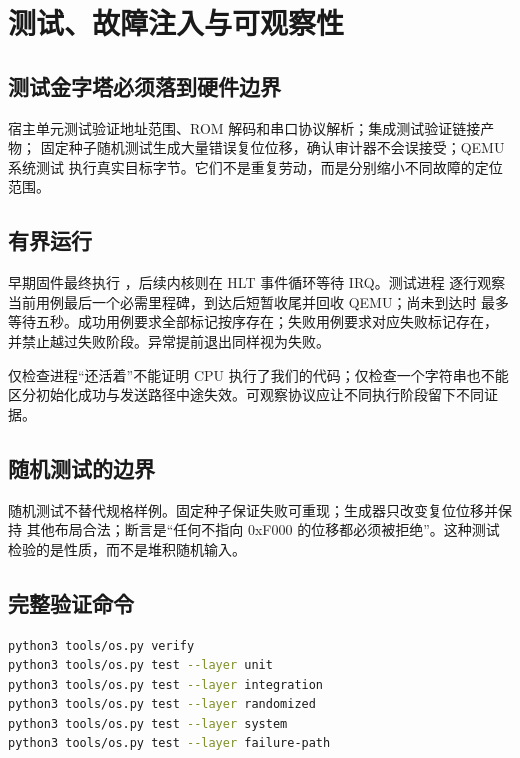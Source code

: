 \section{测试、故障注入与可观察性}

\subsection{测试金字塔必须落到硬件边界}

宿主单元测试验证地址范围、ROM 解码和串口协议解析；集成测试验证链接产物；
固定种子随机测试生成大量错误复位位移，确认审计器不会误接受；QEMU 系统测试
执行真实目标字节。它们不是重复劳动，而是分别缩小不同故障的定位范围。

\subsection{有界运行}

早期固件最终执行 ，后续内核则在 HLT 事件循环等待 IRQ。测试进程
逐行观察当前用例最后一个必需里程碑，到达后短暂收尾并回收 QEMU；尚未到达时
最多等待五秒。成功用例要求全部标记按序存在；失败用例要求对应失败标记存在，
并禁止越过失败阶段。异常提前退出同样视为失败。

\begin{failurebox}
仅检查进程“还活着”不能证明 CPU 执行了我们的代码；仅检查一个字符串也不能
区分初始化成功与发送路径中途失效。可观察协议应让不同执行阶段留下不同证据。
\end{failurebox}

\subsection{随机测试的边界}

随机测试不替代规格样例。固定种子保证失败可重现；生成器只改变复位位移并保持
其他布局合法；断言是“任何不指向 0xF000 的位移都必须被拒绝”。这种测试
检验的是性质，而不是堆积随机输入。

\subsection{完整验证命令}

\begin{lstlisting}[language=bash]
python3 tools/os.py verify
python3 tools/os.py test --layer unit
python3 tools/os.py test --layer integration
python3 tools/os.py test --layer randomized
python3 tools/os.py test --layer system
python3 tools/os.py test --layer failure-path
\end{lstlisting}


